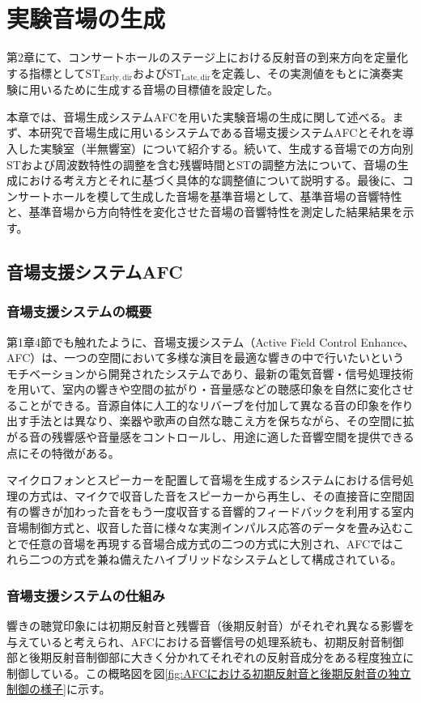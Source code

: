 \documentclass[11pt,a4j]{jreport}
\begin{document}
\chapter{実験音場の生成}

第2章にて、コンサートホールのステージ上における反射音の到来方向を定量化する指標として$\mathrm{ST_{Early,dir}}$および$\mathrm{ST_{Late,dir}}$を定義し、その実測値をもとに演奏実験に用いるために生成する音場の目標値を設定した。

本章では、音場生成システムAFCを用いた実験音場の生成に関して述べる。まず、本研究で音場生成に用いるシステムである音場支援システムAFCとそれを導入した実験室（半無響室）について紹介する。続いて、生成する音場での方向別STおよび周波数特性の調整を含む残響時間とSTの調整方法について、音場の生成における考え方とそれに基づく具体的な調整値について説明する。最後に、コンサートホールを模して生成した音場を基準音場として、基準音場の音響特性と、基準音場から方向特性を変化させた音場の音響特性を測定した結果結果を示す。


\section{音場支援システムAFC}

\subsection*{音場支援システムの概要}
第1章4節でも触れたように、音場支援システム（Active Field Control Enhance、AFC）は、一つの空間において多様な演目を最適な響きの中で行いたいというモチベーションから開発されたシステムであり、最新の電気音響・信号処理技術を用いて、室内の響きや空間の拡がり・音量感などの聴感印象を自然に変化させることができる\cite{AFC}。音源自体に人工的なリバーブを付加して異なる音の印象を作り出す手法とは異なり、楽器や歌声の自然な聴こえ方を保ちながら、その空間に拡がる音の残響感や音量感をコントロールし、用途に適した音響空間を提供できる点にその特徴がある。

マイクロフォンとスピーカーを配置して音場を生成するシステムにおける信号処理の方式は、マイクで収音した音をスピーカーから再生し、その直接音に空間固有の響きが加わった音をもう一度収音する音響的フィードバックを利用する室内音場制御方式と、収音した音に様々な実測インパルス応答のデータを畳み込むことで任意の音場を再現する音場合成方式の二つの方式に大別され、AFCではこれら二つの方式を兼ね備えたハイブリッドなシステムとして構成されている。

\newpage
\subsection*{音場支援システムの仕組み}
響きの聴覚印象には初期反射音と残響音（後期反射音）がそれぞれ異なる影響を与えていると考えられ、AFCにおける音響信号の処理系統も、初期反射音制御部と後期反射音制御部に大きく分かれてそれぞれの反射音成分をある程度独立に制御している。この概略図を図\ref{fig:AFCにおける初期反射音と後期反射音の独立制御の様子}に示す。
\end{document}
